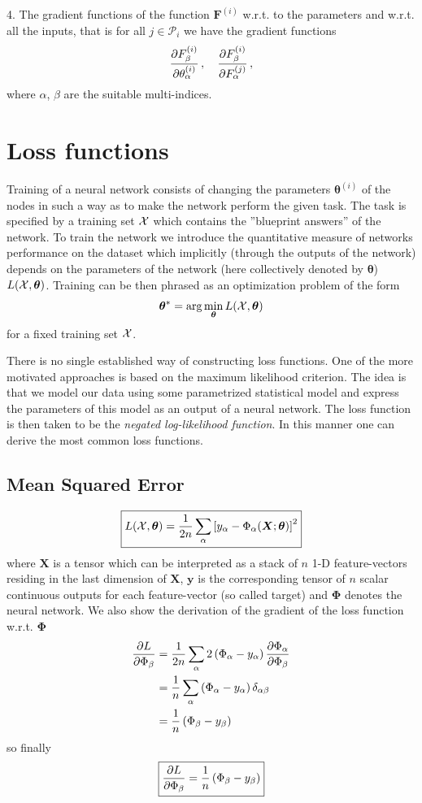 \documentclass{myclass}
\begin{document}
\medskip

4. The gradient functions of the function \(\bm{F}^{(i)}\) w.r.t. to the parameters and w.r.t. all
the inputs, that is for all \(j \in \mathscr{P}_i\) we have the gradient functions
\[
   \pdv{F_\beta ^{(i)}}{\theta_\alpha ^{(i)}}\,,\quad \pdv{F_\beta ^{(i)}}{F_\alpha ^{(j)}} \,,
\]
where \(\alpha\), \(\beta\) are the suitable multi-indices.


\section{Loss functions}

Training of a neural network consists of changing the parameters \(\bm{\theta}^{(i)}\) of the nodes
in such a way as to make the network perform the given task. The task is specified by a training set
\(\mathcal{X}\) which contains the ''blueprint answers'' of the network. To train the network we
introduce the quantitative measure of networks performance on the dataset which implicitly (through
the outputs of the network) depends on the parameters of the network (here collectively denoted by
\(\bm{\theta}\)) \(L(\mathcal{X}, \bm{\theta})\). Training can be then phrased as an optimization problem
of the form
\[
   \bm{\theta}^* = \arg \min_{\bm{\theta}} L(\mathcal{X}, \bm{\theta})
\]
for a fixed training set \(\mathcal{X}\).

\medskip

There is no single established way of constructing loss functions. One of the more motivated
approaches is based on the maximum likelihood criterion. The idea is that we model our data using
some parametrized statistical model and express the parameters of this model as an output of a
neural network. The loss function is then taken to be the \emph{negated log-likelihood function}. In
this manner one can derive the most common loss functions.


\subsection{Mean Squared Error}

\[
\boxed{ L(\mathcal{X}, \bm{\theta}) = \frac{1}{2n} \sum_\alpha \left[ y_\alpha - \Phi_\alpha(\bm{X};\bm{\theta}) \right]^2}
\] 
where \(\bm{X}\) is a tensor which can be interpreted as a stack of \(n\) 1-D feature-vectors
residing in the last dimension of \(\bm{X}\), \(\bm{y}\) is the corresponding tensor of \(n\) scalar
continuous outputs for each feature-vector (so called target) and \(\bm{\Phi}\) denotes the neural
network. We also show the derivation of the gradient of the loss function w.r.t. \(\bm{\Phi}\)
\[
\begin{split}
   \pdv{L}{\Phi_\beta} &= \frac{1}{2n} \sum_\alpha 2 \left( \Phi_\alpha - y_\alpha \right) \pdv{\Phi_\alpha}{\Phi_\beta} \\
                       &= \frac{1}{n} \sum_\alpha \left( \Phi_\alpha - y_\alpha \right) \delta_{\alpha\beta}\\
                       &= \frac{1}{n} \left( \Phi_\beta - y_\beta \right)
\end{split}
\]
so finally
\[
\boxed{\pdv{L}{\Phi_\beta} = \frac{1}{n} \left( \Phi_\beta - y_\beta \right) }
\]
\end{document}
